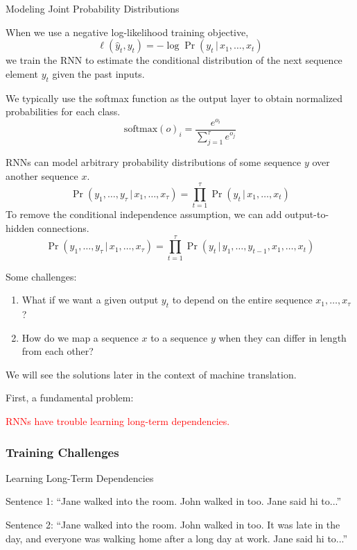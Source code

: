 \documentclass[english]{article}
\begin{document}
\item 
 {Modeling Joint Probability Distributions}

When we use a negative log-likelihood training objective,
$$\ell(\hat{y}_t,y_t) = -\log{\Pr(y_t\,|\,x_1,\dots,x_t)}$$
we train the RNN to estimate the conditional distribution of the next sequence element $y_t$ given the past inputs.
 
We typically use the softmax function as the output layer to obtain normalized probabilities for each class.
$$\text{softmax}(o)_i=\frac{e^{o_i}}{\sum_{j=1}^\tau e^{o_j}}$$
 

RNNs can model arbitrary probability distributions of some sequence $y$ over another sequence $x$.
$$\Pr(y_1,\dots,y_\tau\,|\,x_1,\dots,x_\tau) = \prod_{t=1}^\tau \Pr(y_t\,|\,x_1,\dots,x_t)$$
To remove the conditional independence assumption, we can add output-to-hidden connections.
$$\Pr(y_1,\dots,y_\tau\,|\,x_1,\dots,x_\tau) = \prod_{t=1}^\tau \Pr(y_t\,|\,y_1,\dots,y_{t-1}, x_1,\dots,x_t)$$
 

Some challenges:
\begin{enumerate}
\item What if we want a given output $y_t$ to depend on the entire sequence $x_1,\dots,x_\tau$?
\item How do we map a sequence $x$ to a sequence $y$ when they can differ in length from each other?
\end{enumerate}
\vspace{5mm}
We will see the solutions later in the context of machine translation.
 
First, a fundamental problem: \begin{center}\textcolor{red}{RNNs have trouble learning long-term dependencies.}\end{center}
 \eenum

\subsubsection{Training Challenges}
\benum
\item 
 {Learning Long-Term Dependencies}

Sentence 1: ``Jane walked into the room. John walked in too. Jane said hi to...'' 

Sentence 2: ``Jane walked into the room. John walked in too. It was late in the day, and everyone was walking home after a long day at work. Jane said hi to...'' 
\end{document}

